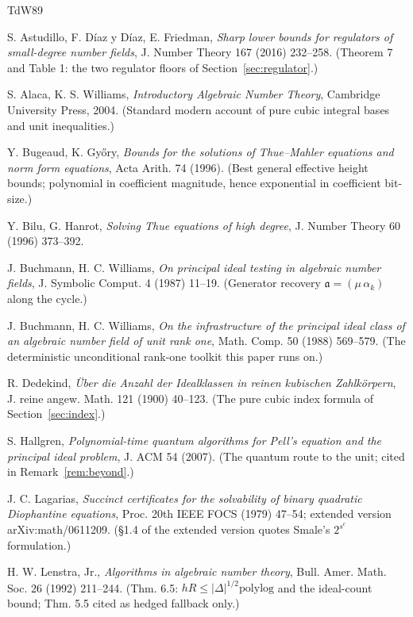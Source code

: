 \documentclass[11pt]{amsart}
\theoremstyle{plain}
\theoremstyle{remark}
\begin{document}
\begin{thebibliography}{TdW89}

 S. Astudillo, F. D\'iaz y D\'iaz, E. Friedman,
  \emph{Sharp lower bounds for regulators of small-degree number
  fields}, J. Number Theory 167 (2016) 232--258. (Theorem 7 and
  Table 1: the two regulator floors of
  Section~\ref{sec:regulator}.)

 S. Alaca, K. S. Williams, \emph{Introductory
  Algebraic Number Theory}, Cambridge University Press, 2004.
  (Standard modern account of pure cubic integral bases and unit
  inequalities.)

 Y. Bugeaud, K. Gy\H{o}ry, \emph{Bounds for the
  solutions of Thue--Mahler equations and norm form equations}, Acta
  Arith. 74 (1996). (Best general effective height bounds; polynomial
  in coefficient magnitude, hence exponential in coefficient
  bit-size.)

 Y. Bilu, G. Hanrot, \emph{Solving Thue equations
  of high degree}, J. Number Theory 60 (1996) 373--392.

 J. Buchmann, H. C. Williams, \emph{On principal
  ideal testing in algebraic number fields}, J. Symbolic Comput. 4
  (1987) 11--19. (Generator recovery
  $\mathfrak{a} = (\mu\,\alpha_k)$ along the cycle.)

 J. Buchmann, H. C. Williams, \emph{On the
  infrastructure of the principal ideal class of an algebraic number
  field of unit rank one}, Math. Comp. 50 (1988) 569--579. (The
  deterministic unconditional rank-one toolkit this paper runs on.)

 R. Dedekind, \emph{\"Uber die Anzahl der
  Idealklassen in reinen kubischen Zahlk\"orpern}, J. reine angew.
  Math. 121 (1900) 40--123. (The pure cubic index formula of
  Section~\ref{sec:index}.)

 S. Hallgren, \emph{Polynomial-time quantum
  algorithms for Pell's equation and the principal ideal problem},
  J. ACM 54 (2007). (The quantum route to the unit; cited in
  Remark~\ref{rem:beyond}.)

 J. C. Lagarias, \emph{Succinct certificates
  for the solvability of binary quadratic Diophantine equations},
  Proc. 20th IEEE FOCS (1979) 47--54; extended version
  arXiv:math/0611209. (\S 1.4 of the extended version quotes Smale's
  $2^{s^c}$ formulation.)

 H. W. Lenstra, Jr., \emph{Algorithms in
  algebraic number theory}, Bull. Amer. Math. Soc. 26 (1992)
  211--244. (Thm. 6.5: $hR \le |\Delta|^{1/2}\mathrm{polylog}$ and
  the ideal-count bound; Thm. 5.5 cited as hedged fallback only.)


\end{thebibliography}
\end{document}
